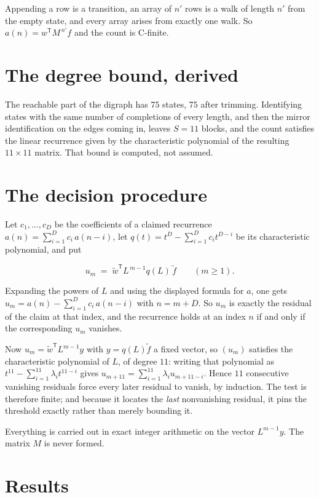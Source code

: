 \documentclass[11pt]{article}
\theoremstyle{definition}
\begin{document}
Appending a row is a transition, an array of $n'$ rows is a walk of length $n'$ from the empty state, and every array arises from exactly one walk. So $a(n) = w^{\mathsf T}M^{\,n'}f$ and the count is C-finite.

\section{The degree bound, derived}

The reachable part of the digraph has $75$ states, $75$ after trimming. Identifying states with the same number of completions of every length, and then the mirror identification on the edges coming in, leaves $S = 11$ blocks, and the count satisfies the linear recurrence given by the characteristic polynomial of the resulting $11\times11$ matrix. That bound is computed, not assumed.

\section{The decision procedure}

Let $c_1,\dots,c_D$ be the coefficients of a claimed recurrence $a(n) = \sum_{i=1}^{D} c_i\,a(n-i)$, let $q(t) = t^{D} - \sum_{i=1}^{D} c_i t^{D-i}$ be its characteristic polynomial, and put

\[u_m \;=\; \tilde w^{\mathsf T} L^{\,m-1} q(L)\,\tilde f \qquad (m \ge 1).\]

Expanding the powers of $L$ and using the displayed formula for $a$, one gets $u_m = a(n) - \sum_{i=1}^{D} c_i\,a(n-i)$ with $n = m + D$. So $u_m$ is exactly the residual of the claim at that index, and the recurrence holds at an index $n$ if and only if the corresponding $u_m$ vanishes.

Now $u_m = \tilde w^{\mathsf T} L^{m-1} y$ with $y = q(L)\tilde f$ a fixed vector, so $(u_m)$ satisfies the characteristic polynomial of $L$, of degree $11$: writing that polynomial as $t^{11} - \sum_{i=1}^{11} \lambda_i t^{11-i}$ gives $u_{m+11} = \sum_{i=1}^{11} \lambda_i u_{m+11-i}$. Hence $11$ consecutive vanishing residuals force every later residual to vanish, by induction. The test is therefore finite; and because it locates the {\itshape last} nonvanishing residual, it pins the threshold exactly rather than merely bounding it.

Everything is carried out in exact integer arithmetic on the vector $L^{m-1}y$. The matrix $M$ is never formed.

\section{Results}
\end{document}
